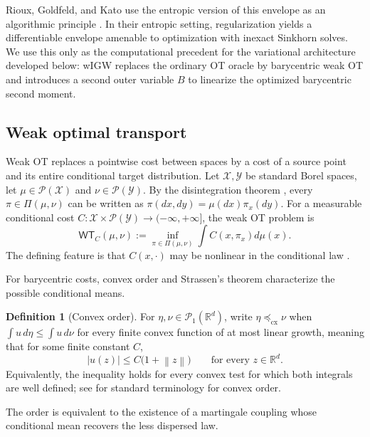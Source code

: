 \documentclass[11pt]{article}
\newcommand{\R}{\mathbb R}
\newcommand{\cP}{\mathcal P}
\newcommand{\norm}[1]{\left\lVert #1\right\rVert}
\newcommand{\cx}{\preceq_{\mathrm{cx}}}
\theoremstyle{plain}
\theoremstyle{definition}
\newtheorem{definition}[theorem]{Definition}
\theoremstyle{remark}
\begin{document}
Rioux, Goldfeld, and Kato use the entropic version of this envelope as an
algorithmic principle \cite{RiouxGoldfeldKato2024}. In their entropic setting,
regularization yields a differentiable envelope amenable to optimization with
inexact Sinkhorn solves. We use this only as the
computational precedent for the variational architecture developed below: wIGW
replaces the ordinary OT oracle by barycentric weak OT and introduces a second outer
variable $B$ to linearize the optimized barycentric second moment.

\subsection{Weak optimal transport}\label{subsec:weak-ot}

Weak OT replaces a pointwise cost between spaces by a cost of a source
point and its entire conditional target distribution. Let $\mathcal X,\mathcal Y$ be standard Borel
spaces, let $\mu\in\cP(\mathcal X)$ and $\nu\in\cP(\mathcal Y)$. By the
disintegration theorem \cite[Theorem~3.4]{Kallenberg}, every
$\pi\in\Pi(\mu,\nu)$ can be written as
$\pi(dx,dy)=\mu(dx)\pi_x(dy)$. For a measurable conditional cost
$C:\mathcal X\times\cP(\mathcal Y)\to(-\infty,+\infty]$, the weak OT problem is
\begin{equation}\label{eq:generic-wot}
 \mathsf{WT}_{C}(\mu,\nu)
 :=\inf_{\pi\in\Pi(\mu,\nu)}\int C(x,\pi_x)d\mu(x).
\end{equation}
The defining feature is that $C(x,\cdot)$ may be nonlinear in the conditional law
\cite{GRST,BBP}.

For barycentric costs, convex order and Strassen's theorem characterize the
possible conditional means.

\begin{definition}[Convex order]\label{def:convex-order}
For $\eta,\nu\in\cP_1(\R^d)$, write $\eta\cx\nu$ when
$\int u\,d\eta\le\int u\,d\nu$ for every finite convex function of at most linear
growth, meaning that for some finite constant $C$,
\[
 |u(z)|\le C\bigl(1+\norm z\bigr)
 \qquad\text{for every }z\in\R^d.
\]
Equivalently, the inequality holds for every convex test for which both
integrals are well defined; see \cite[Chapter~7]{ShakedShanthikumar2007} for
standard terminology for convex order.
\end{definition}

The order is equivalent to the existence of a martingale coupling whose
conditional mean recovers the less dispersed law.
\end{document}
